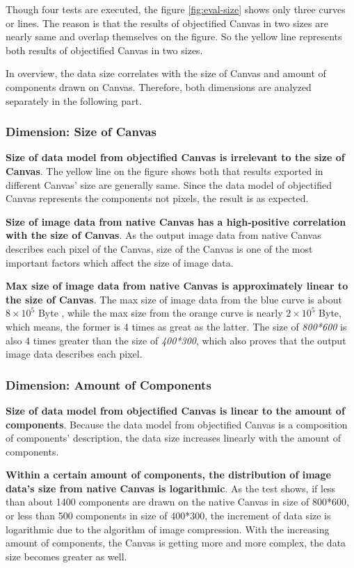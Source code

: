 Though four tests are executed, the figure \ref{fig:eval-size} shows only three curves or lines. The reason is that the results of objectified Canvas in two sizes are nearly same and overlap themselves on the figure. So the yellow line represents both results of objectified Canvas in  two sizes.

In overview, the data size correlates with the size of Canvas and amount of components drawn on Canvas. Therefore, both dimensions are analyzed separately in the following part.

\subsubsection{Dimension: Size of Canvas}


\textbf{Size of data model from objectified Canvas is irrelevant to the size of Canvas}. The yellow line on the figure shows both that results exported in different Canvas' size are generally same. Since the data model of objectified Canvas represents the components not pixels, the result is as expected.   

\textbf{Size of image data from native Canvas has a high-positive correlation with the size of Canvas}. As the output image data from native Canvas describes each pixel of the Canvas, size of the Canvas is one of the most important factors which affect the size of image data.

\textbf{Max size of image data from native Canvas is approximately linear to the size of Canvas}. The max size of image data from the blue curve is about $8\times 10^{5}$ Byte , while the max size from the orange curve is nearly $2\times 10^{5}$ Byte, which means, the former is 4 times as great as the latter. The size of \textit{800*600} is also 4 times greater than the size of \textit{400*300}, which also proves that the output image data describes each pixel.


\subsubsection{Dimension: Amount of Components}


\textbf{Size of data model from objectified Canvas is linear to the amount of components}. Because the data model from objectified Canvas is a composition of components' description, the data size increases linearly with the amount of components.

\textbf{Within a certain amount of components, the distribution of image data's size from native Canvas is logarithmic}. As the test shows, if less than about 1400 components are drawn on the native Canvas in size of 800*600, or less than 500 components in size of 400*300, the increment of data size is logarithmic due to the algorithm of image compression. With the increasing amount of components, the Canvas is getting more and more complex, the data size becomes greater as well.  

